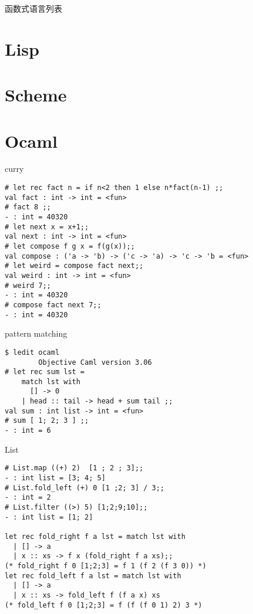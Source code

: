 \begin{frame}{函数式语言列表}
\begin{center}\end{center}
\end{frame}

\section{Lisp}
\section{Scheme}
\section{Ocaml}
\begin{frame}[containsverbatim]{curry}
\lstset{language=[objective]caml}
\begin{lstlisting}
# let rec fact n = if n<2 then 1 else n*fact(n-1) ;;
val fact : int -> int = <fun>
# fact 8 ;;
- : int = 40320
# let next x = x+1;;
val next : int -> int = <fun>
# let compose f g x = f(g(x));;
val compose : ('a -> 'b) -> ('c -> 'a) -> 'c -> 'b = <fun>
# let weird = compose fact next;;
val weird : int -> int = <fun>
# weird 7;;
- : int = 40320
# compose fact next 7;;
- : int = 40320
\end{lstlisting}
\end{frame}

\begin{frame}[containsverbatim]{pattern matching}
\lstset{language=[objective]caml}
\begin{lstlisting}
$ ledit ocaml
        Objective Caml version 3.06
# let rec sum lst =
    match lst with
      [] -> 0
    | head :: tail -> head + sum tail ;;
val sum : int list -> int = <fun>
# sum [ 1; 2; 3 ] ;;
- : int = 6
\end{lstlisting}
\end{frame}


\begin{frame}[containsverbatim]{List}
\lstset{language=[objective]caml}
\begin{lstlisting}
# List.map ((+) 2)  [1 ; 2 ; 3];;
- : int list = [3; 4; 5]
# List.fold_left (+) 0 [1 ;2; 3] / 3;;
- : int = 2
# List.filter ((>) 5) [1;2;9;10];;
- : int list = [1; 2]

let rec fold_right f a lst = match lst with
  | [] -> a
  | x :: xs -> f x (fold_right f a xs);;
(* fold_right f 0 [1;2;3] = f 1 (f 2 (f 3 0)) *)
let rec fold_left f a lst = match lst with
  | [] -> a
  | x :: xs -> fold_left f (f a x) xs
(* fold_left f 0 [1;2;3] = f (f (f 0 1) 2) 3 *)
\end{lstlisting}
\end{frame}

